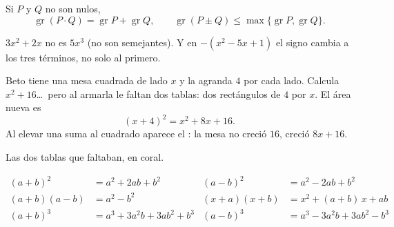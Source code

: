 \documentclass[11pt,a4paper]{article}
\begin{document}
\begin{propiedad}
Si $P$ y $Q$ no son nulos,
\[ \operatorname{gr}(P\cdot Q)=\operatorname{gr}P+\operatorname{gr}Q,\qquad \operatorname{gr}(P\pm Q)\le\max\{\operatorname{gr}P,\operatorname{gr}Q\}. \]
\end{propiedad}
\begin{ojo}
$3x^2+2x$ no es $5x^3$ (no son semejantes). Y en $-(x^2-5x+1)$ el signo cambia a los tres términos, no solo al primero.
\end{ojo}


\begin{minipage}[c]{0.56\linewidth}
Beto tiene una mesa cuadrada de lado $x$ y la agranda $4$ por cada lado. Calcula $x^2+16$\dots\ pero al armarla le
faltan dos tablas: dos rectángulos de $4$ por $x$. El área nueva es
\[ (x+4)^2=x^2+8x+16 . \]
Al elevar una suma al cuadrado aparece el : la mesa no creció $16$, creció $8x+16$.
\end{minipage}\hfill
\begin{minipage}[c]{0.4\linewidth}\centering
{}

{\footnotesize\color{zmute}Las dos tablas que faltaban, en coral.}
\end{minipage}

\begin{propiedad}
\vspace{-6pt}
\begin{align*}
(a+b)^2&=a^2+2ab+b^2 & (a-b)^2&=a^2-2ab+b^2\\
(a+b)(a-b)&=a^2-b^2 & (x+a)(x+b)&=x^2+(a+b)\,x+ab\\
(a+b)^3&=a^3+3a^2b+3ab^2+b^3 & (a-b)^3&=a^3-3a^2b+3ab^2-b^3
\end{align*}
\end{propiedad}
\end{document}
